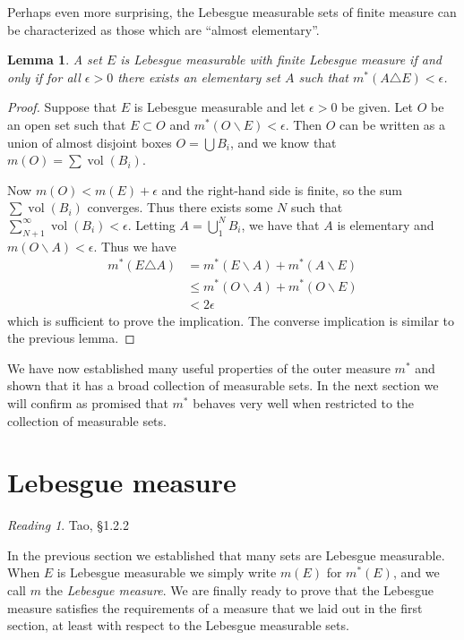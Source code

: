 \documentclass[11pt,oneside]{amsbook}
\renewcommand{\setminus}{\smallsetminus}
\DeclareMathOperator{\vol}{vol}
\theoremstyle{definition}
\theoremstyle{plain}
\newtheorem{lem}[thm]{Lemma}
\theoremstyle{definition}
\theoremstyle{remark}
\newtheorem*{reading}{Reading}
\numberwithin{equation}{section}
\numberwithin{figure}{section}
\begin{document}
Perhaps even more surprising, the Lebesgue measurable sets of finite measure can be characterized as those which are ``almost elementary''.

\begin{lem}
  A set $E$ is Lebesgue measurable with finite Lebesgue measure if and only if for all $\epsilon>0$ there exists an elementary set $A$ such that $m^*(A\triangle E)<\epsilon$.
\end{lem}

\begin{proof}
  Suppose that $E$ is Lebesgue measurable and let $\epsilon>0$ be given. Let $O$ be an open set such that $E\subset O$ and $m^*(O\setminus E)<\epsilon$. Then $O$ can be written as a union of almost disjoint boxes $O=\bigcup B_i$, and we know that $m(O)=\sum\vol(B_i)$.

  Now $m(O)<m(E)+\epsilon$ and the right-hand side is finite, so the sum $\sum\vol(B_i)$ converges. Thus there exists some $N$ such that $\sum_{N+1}^\infty\vol(B_i)<\epsilon$. Letting $A=\bigcup_1^NB_i$, we have that $A$ is elementary and $m(O\setminus A)<\epsilon$. Thus we have
  \begin{align*}
    m^*(E\triangle A)&=m^*(E\setminus A)+m^*(A\setminus E)\\
                     &\leq m^*(O\setminus A)+m^*(O\setminus E)\\
                     &<2\epsilon
  \end{align*}
  which is sufficient to prove the implication. The converse implication is similar to the previous lemma.
\end{proof}

We have now established many useful properties of the outer measure $m^*$ and shown that it has a broad collection of measurable sets. In the next section we will confirm as promised that $m^*$ behaves very well when restricted to the collection of measurable sets.

\newpage
\section{Lebesgue measure}

\begin{reading}
  Tao, \S 1.2.2
\end{reading}

In the previous section we established that many sets are Lebesgue measurable. When $E$ is Lebesgue measurable we simply write $m(E)$ for $m^*(E)$, and we call $m$ the \emph{Lebesgue measure}. We are finally ready to prove that the Lebesgue measure satisfies the requirements of a measure that we laid out in the first section, at least with respect to the Lebesgue measurable sets.
\end{document}

